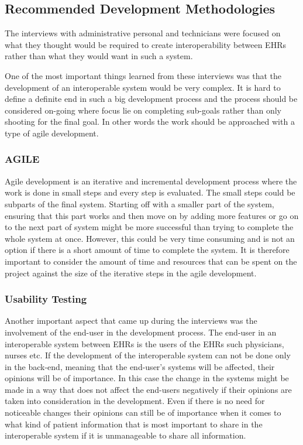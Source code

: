 \documentclass[14pt]{article}
\begin{document}
\subsection{Recommended Development Methodologies}
The interviews with administrative personal and technicians were focused on what they thought would be required to create interoperability between \glspl{EHR} rather than what they would want in such a system. 

One of the most important things learned from these interviews was that the development of an interoperable system would be very complex. It is hard to define a definite end in such a big development process and the process should be considered on-going where focus lie on completing sub-goals rather than only shooting for the final goal. In other words the work should be approached with a type of agile development. 

\subsubsection{AGILE}
Agile development is an iterative and incremental development process where the work is done in small steps and every step is evaluated. The small steps could be subparts of the final system. Starting off with a smaller part of the system, ensuring that this part works and then move on by adding more features or go on to the next part of system might be more successful than trying to complete the whole system at once. However, this could be very time consuming and is not an option if there is a short amount of time to complete the system. It is therefore important to consider the amount of time and resources that can be spent on the project against the size of the iterative steps in the agile development.

\subsubsection{Usability Testing}
Another important aspect that came up during the interviews was the involvement of the end-user in the development process. The end-user in an interoperable system between \glspl{EHR} is the users of the \glspl{EHR} such physicians, nurses etc. If the development of the interoperable system can not be done only in the back-end, meaning that the end-user's systems will be affected, their opinions will be of importance. In this case the change in the systems might be made in a way that does not affect the end-users negatively if their opinions are taken into consideration in the development. Even if there is no need for noticeable changes their opinions can still be of importance when it comes to what kind of patient information that is most important to share in the interoperable system if it is unmanageable to share all information. 
\end{document}
